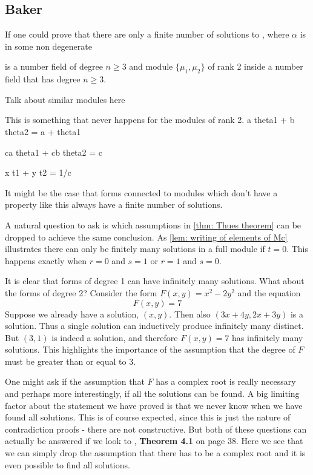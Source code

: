 \documentclass{article}
\begin{document}

\subsection*{Baker}

If one could prove that there are only a finite number of solutions to , where $\alpha$ is in some non degenerate 


is a number field of degree $n \geq 3$ and  module $\{\mu_1, \mu_2 \}$ of rank 2 inside a number field that has degree $n \geq 3$. 



Talk about similar modules here




This is something that never happens for the modules of rank 2. a theta1 + b theta2 = a + theta1

ca theta1 + cb theta2 = c 



x t1 + y t2 = 1/c







It might be the case that forms connected to modules which don't have a property like this always have a finite number of solutions. 



A natural question to ask is which assumptions in \cref{thm: Thues theorem} can be dropped to achieve the same conclusion. As \cref{lem: writing of elements of Mc} illustrates there can only be finitely many solutions in a full module if $t = 0$. This happens exactly when $r = 0$ and $s = 1$ or $r = 1$ and $s = 0$. 

It is clear that forms of degree 1 can have infinitely many solutions. What about the forms of degree 2? Consider the form $F(x,y) = x^2 - 2y^2$ and the equation 
$$F(x, y) = 7$$
Suppose we already have a solution, $(x,y)$. Then also $(3x + 4y, 2x + 3y)$ is a solution. Thus a single solution can inductively produce infinitely many distinct. But $(3,1)$ is indeed a solution, and therefore $F(x, y) = 7$ has infinitely many solutions. This highlights the importance of the assumption that the degree of $F$ must be greater than or equal to 3.   


One might ask if the assumption that $F$ has a complex root is really necessary and perhaps more interestingly, if all the solutions can be found. A big limiting factor about the statement we have proved is that we never know when we have found all solutions. This is of course expected, since this is just the nature of contradiction proofs - there are not constructive. But both of these questions can actually be answered if we look to \cite{baker}, \textbf{Theorem 4.1} on page 38. Here we see that we can simply drop the assumption that there has to be a complex root and it is even possible to find all solutions.


\end{document}
